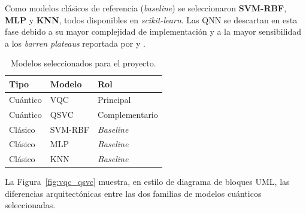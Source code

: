 \documentclass[a4paper,10pt,twocolumn]{article}
\begin{document}
\noindent Como modelos cl\'asicos de referencia (\textit{baseline}) se
seleccionaron \textbf{SVM-RBF}, \textbf{MLP} y \textbf{KNN}, todos
disponibles en \textit{scikit-learn}. Las QNN se descartan en esta
fase debido a su mayor complejidad de implementaci\'on y a la mayor
sensibilidad a los \textit{barren plateaus} reportada por
\citet{mcclean2018} y \citet{larocca2025}.

\begin{table}[H]
\centering
\caption{Modelos seleccionados para el proyecto.}
\label{tab:modelos}
\small
\begin{tabular}{@{}lll@{}}
\toprule
\textbf{Tipo} & \textbf{Modelo} & \textbf{Rol} \\
\midrule
Cu\'antico & VQC      & Principal          \\
Cu\'antico & QSVC     & Complementario     \\
Cl\'asico  & SVM-RBF  & \textit{Baseline}  \\
Cl\'asico  & MLP      & \textit{Baseline}  \\
Cl\'asico  & KNN      & \textit{Baseline}  \\
\bottomrule
\end{tabular}
\end{table}

\noindent La Figura~\ref{fig:vqc_qsvc} muestra, en estilo de diagrama de
bloques UML, las diferencias arquitect\'onicas entre las dos familias
de modelos cu\'anticos seleccionadas.
\end{document}
